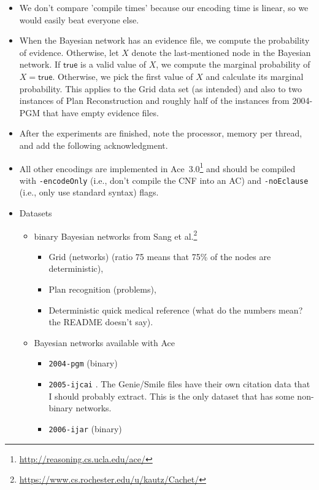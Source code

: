\documentclass{article}
\theoremstyle{definition}
\theoremstyle{remark}
\begin{document}
\begin{itemize}
\item We don't compare 'compile times' because our encoding time is linear, so
  we would easily beat everyone else.
\item When the Bayesian network has an evidence file, we compute the probability
  of evidence. Otherwise, let $X$ denote the last-mentioned node in the Bayesian
  network. If $\mathsf{true}$ is a valid value of $X$, we compute the marginal
  probability of $X = \mathsf{true}$. Otherwise, we pick the first value of $X$
  and calculate its marginal probability. This applies to the Grid data set (as
  intended) and also to two instances of Plan Reconstruction and roughly half of
  the instances from 2004-PGM that have empty evidence files.
\item After the experiments are finished, note the processor, memory per thread,
  and add the following acknowledgment.
\item All other encodings are implemented in
  Ace~3.0\footnote{\url{http://reasoning.cs.ucla.edu/ace/}} and should be
  compiled with \texttt{-encodeOnly} (i.e., don't compile the CNF into an AC)
  and \texttt{-noEclause} (i.e., only use standard syntax) flags.
\item Datasets
  \begin{itemize}
  \item binary Bayesian networks from Sang et
    al.\footnote{\url{https://www.cs.rochester.edu/u/kautz/Cachet/}}
    \cite{DBLP:conf/aaai/SangBK05}
    \begin{itemize}
    \item Grid (networks) (ratio 75 means that 75\% of the nodes are
      deterministic),
    \item Plan recognition (problems),
    \item Deterministic quick medical reference (what do the numbers mean? the
      README doesn't say).
    \end{itemize}
  \item Bayesian networks available with Ace
    \begin{itemize}
    \item \texttt{2004-pgm} \cite{DBLP:journals/ijar/ChaviraDJ06} (binary)
    \item \texttt{2005-ijcai} \cite{DBLP:conf/ijcai/ChaviraD05}. The Genie/Smile
      files have their own citation data that I should probably extract. This is
      the only dataset that has some non-binary networks.
    \item \texttt{2006-ijar} \cite{DBLP:journals/ijar/ChaviraDJ06} (binary)
    \end{itemize}
  \end{itemize}
\end{itemize}
\end{document}
